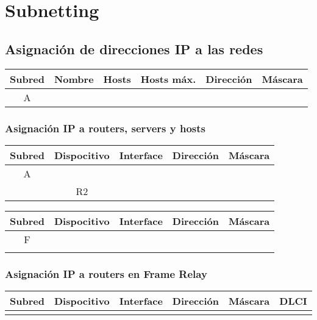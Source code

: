\documentclass[12pt,a4paper,spanish]{article}
\begin{document}

\newpage
\tableofcontents
\newpage

\section{Subnetting}
\subsection{Asignación de direcciones IP a las redes}
\begin{tabular}{|c|c|c|c|c|c|}
	\hline
	Subred & Nombre & Hosts & Hosts máx. & Dirección & Máscara \\
	\hline
	\hline
	A &  &  &  &  &  \\
	\hline
\end{tabular}



\subsubsection{Asignación IP a routers, servers y hosts}

\begin{tabular}{|c|c|c|c|c|}
	\hline
	Subred & Dispocitivo & Interface & Dirección & Máscara \\
	\hline
	\hline
	A &  &  &  & \\
	\hline
	  & R2 &  &  &  \\
	\hline
\end{tabular}



\begin{tabular}{|c|c|c|c|c|}
	\hline
	Subred & Dispocitivo & Interface & Dirección & Máscara \\
	\hline
	\hline
	F & & & & \\
	\hline
	  &  &  &  &  \\
	\hline
\end{tabular}

\subsubsection{Asignación IP a routers en Frame Relay}

\begin{tabular}{|c|c|c|c|c|c|}
	\hline
	Subred & Dispocitivo & Interface & Dirección & Máscara & DLCI \\
	\hline	
	\hline
	 &  &  &  &  &  \\
	\hline
\end{tabular}
\end{document}
